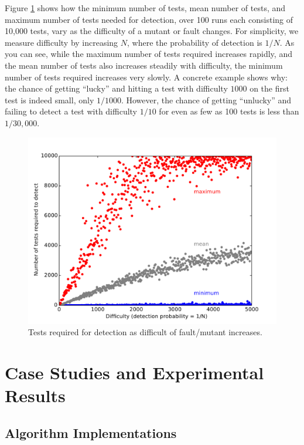 \documentclass{svjour3}
\begin{document}
Figure \ref{fig:probmodel} shows how the minimum number of tests, mean
number of tests, and maximum number of tests needed for detection,
over 100 runs each consisting of 10,000 tests, vary as the difficulty
of a mutant or fault changes.  For simplicity, we measure difficulty
by increasing $N$, where the probability of detection is $1/N$.  As
you can see, while the maximum number of tests required increases
rapidly, and the mean number of tests also increases steadily with
difficulty, the minimum number of tests required increases very
slowly.  A concrete example shows why: the chance of getting ``lucky'' and hitting a test with
difficulty $1000$ on the first test is indeed small, only $1/1000$.  However, the
chance of getting ``unlucky'' and failing to detect a test with
difficulty $1/10$ for even as few as 100 tests is less than $1/30,000$.

\begin{figure}
\includegraphics[width=\columnwidth]{probsmodel}
\caption{Tests required for detection as difficult of fault/mutant increases.}
\label{fig:probmodel}
\end{figure}

\section{Case Studies and Experimental Results}

\subsection{Algorithm Implementations}
\end{document}
